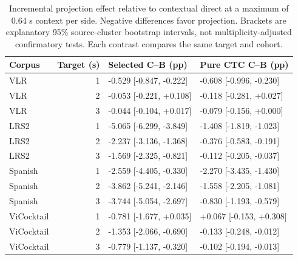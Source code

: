 \begin{table}[tb]
\centering\small
\caption{Incremental projection effect relative to contextual direct at a maximum of 0.64 s context per side. Negative differences favor projection. Brackets are explanatory 95\% source-cluster bootstrap intervals, not multiplicity-adjusted confirmatory tests. Each contrast compares the same target and cohort.}
\label{tab:duration-projection}
\begin{tabular}{lrll}
\toprule
Corpus & Target (s) & Selected C--B (pp) & Pure CTC C--B (pp) \\
\midrule
VLR & 1 & -0.529 [-0.847, -0.222] & -0.608 [-0.996, -0.230] \\
VLR & 2 & -0.053 [-0.221, +0.108] & -0.118 [-0.281, +0.027] \\
VLR & 3 & -0.044 [-0.104, +0.017] & -0.079 [-0.156, +0.000] \\
LRS2 & 1 & -5.065 [-6.299, -3.849] & -1.408 [-1.819, -1.023] \\
LRS2 & 2 & -2.237 [-3.136, -1.368] & -0.376 [-0.583, -0.191] \\
LRS2 & 3 & -1.569 [-2.325, -0.821] & -0.112 [-0.205, -0.037] \\
Spanish & 1 & -2.559 [-4.405, -0.330] & -2.270 [-3.435, -1.430] \\
Spanish & 2 & -3.862 [-5.241, -2.146] & -1.558 [-2.205, -1.081] \\
Spanish & 3 & -3.744 [-5.054, -2.697] & -0.830 [-1.193, -0.579] \\
ViCocktail & 1 & -0.781 [-1.677, +0.035] & +0.067 [-0.153, +0.308] \\
ViCocktail & 2 & -1.353 [-2.066, -0.690] & -0.133 [-0.248, -0.012] \\
ViCocktail & 3 & -0.779 [-1.137, -0.320] & -0.102 [-0.194, -0.013] \\
\bottomrule
\end{tabular}
\end{table}
